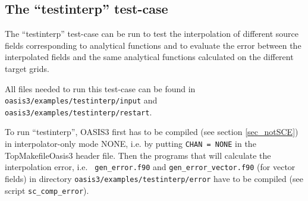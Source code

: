 %
%
%
%
%
\subsection{The ``testinterp'' test-case}
\label{subsec_running_testinterp}

The ``testinterp'' test-case can be run to test the interpolation of
different source fields corresponding to analytical functions 
and to evaluate the error between the
interpolated fields and the same analytical functions calculated on the
different target grids.

All files needed to run this test-case can be found in
{\tt oasis3/examples/testinterp/input} and {\tt oasis3/examples/testinterp/restart}.

To run ``testinterp'', OASIS3 first has to be compiled (see section \ref{sec_notSCE}) in
interpolator-only mode NONE, i.e. by putting 
{\tt CHAN = NONE} in the TopMakefileOasis3 header file. Then
the programs that will calculate the interpolation error, i.e. {\tt
  gen\_error.f90} and {\tt gen\_error\_vector.f90} (for vector
fields) in directory {\tt oasis3/examples/testinterp/error} have to
be compiled (see script {\tt sc\_comp\_error}).

